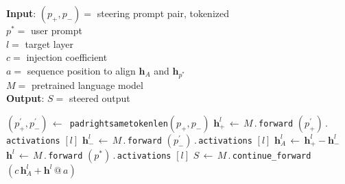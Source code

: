 \begin{algorithm}
\caption{\textbf{\shortmethod}, optimization-free activation addition}\label{alg:cap}
\vspace{1mm}
\hspace*{\algorithmicindent} \textbf{Input}: $(p_+, p_-) =$  steering prompt pair, tokenized \\
\hspace*{\algorithmicindent} \hspace*{\algorithmicindent}\hspace*{\algorithmicindent}
$p^* =$  user prompt \\
\hspace*{\algorithmicindent} \hspace*{\algorithmicindent}\hspace*{\algorithmicindent}
$l =$ target layer \\
\hspace*{\algorithmicindent} \hspace*{\algorithmicindent}\hspace*{\algorithmicindent}
$c =$  injection coefficient\\
\hspace*{\algorithmicindent} \hspace*{\algorithmicindent}\hspace*{\algorithmicindent}
$a =$ sequence position to align $\mathbf{h}_{A}$ and $\mathbf{h}_{p^*}$\\
\hspace*{\algorithmicindent} \hspace*{\algorithmicindent}\hspace*{\algorithmicindent}
$M =$ pretrained language model
\\
\hspace*{\algorithmicindent} \textbf{Output}: $S = $ steered output \\

\begin{algorithmic}

\State $(p_+^\prime, p_-^\prime) \,\leftarrow\,$ \texttt{pad\longscore right\longscore same\longscore token\longscore len}$(p_+, p_-)$
%
\State $\mathbf{h}_+^l \,\leftarrow\, M\,.\,$\texttt{forward} $(p_+^\prime)\,.\,$\texttt{activations} $[l]$
\State $\mathbf{h}_-^l \,\leftarrow\, M\,.\,$\texttt{forward} $(p_-^\prime)\,.\,$\texttt{activations} $[l]$
%
\State $\mathbf{h}_A^l \,\leftarrow\, \mathbf{h}_+^l - \mathbf{h}_-^l$
\State $\mathbf{h}^l \,\leftarrow\, M\,.\,$\texttt{forward} $(p^*)\,.\,$\texttt{activations} $[l]$
\State $S  \,\leftarrow\, M\,.\,$\texttt{continue\_forward} $(c\,\mathbf{h}^l_A + \mathbf{h}^l\,\mathrm{@}\,a)$
%
%
%
\end{algorithmic}
\label{alg}
\end{algorithm}

